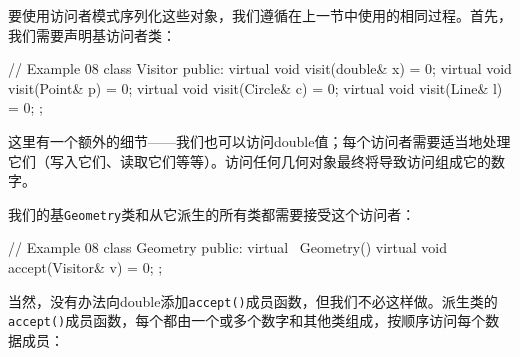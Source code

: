 要使用访问者模式序列化这些对象，我们遵循在上一节中使用的相同过程。首先，我们需要声明基访问者类：

\begin{code}
// Example 08
class Visitor {
public:
  virtual void visit(double& x) = 0;
  virtual void visit(Point& p) = 0;
  virtual void visit(Circle& c) = 0;
  virtual void visit(Line& l) = 0;
};
\end{code}

这里有一个额外的细节——我们也可以访问double值；每个访问者需要适当地处理它们（写入它们、读取它们等等）。访问任何几何对象最终将导致访问组成它的数字。

我们的基\texttt{Geometry}类和从它派生的所有类都需要接受这个访问者：

\begin{code}
// Example 08
class Geometry {
  public:
  virtual ~Geometry() {}
  virtual void accept(Visitor& v) = 0;
};
\end{code}

当然，没有办法向double添加\texttt{accept()}成员函数，但我们不必这样做。派生类的\texttt{accept()}成员函数，每个都由一个或多个数字和其他类组成，按顺序访问每个数据成员：

